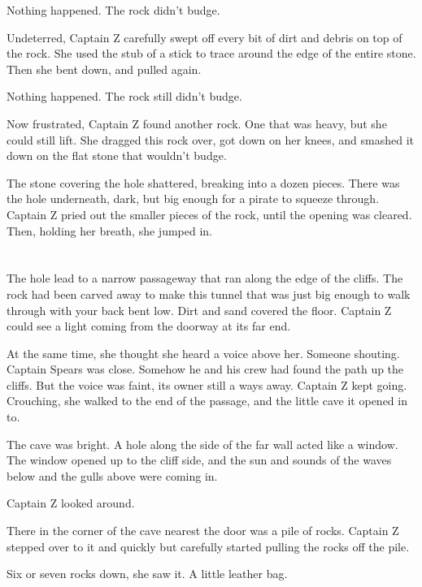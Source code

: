 \documentclass[12pt]{extbook}
\begin{document}
  Nothing happened. The rock didn't budge.
  
  Undeterred, Captain Z carefully swept off every bit of dirt and debris
  on top of the rock. She used the stub of a stick to trace around the
  edge of the entire stone. Then she bent down, and pulled again.
  
  Nothing happened. The rock still didn't budge.
  
  Now frustrated, Captain Z found another rock. One that was heavy, but
  she could still lift. She dragged this rock over, got down on her knees,
  and smashed it down on the flat stone that wouldn't budge.
  
  The stone covering the hole shattered, breaking into a dozen pieces.
  There was the hole underneath, dark, but big enough for a pirate to
  squeeze through. Captain Z pried out the smaller pieces of the rock,
  until the opening was cleared. Then, holding her breath, she jumped in.
  
  \section{}\label{section-19}
  
  The hole lead to a narrow passageway that ran along the edge of the
  cliffs. The rock had been carved away to make this tunnel that was just
  big enough to walk through with your back bent low. Dirt and sand
  covered the floor. Captain Z could see a light coming from the doorway
  at its far end.
  
  At the same time, she thought she heard a voice above her. Someone
  shouting. Captain Spears was close. Somehow he and his crew had found
  the path up the cliffs. But the voice was faint, its owner still a ways
  away. Captain Z kept going. Crouching, she walked to the end of the
  passage, and the little cave it opened in to.
  
  The cave was bright. A hole along the side of the far wall acted like a
  window. The window opened up to the cliff side, and the sun and sounds
  of the waves below and the gulls above were coming in.
  
  Captain Z looked around.
  
  There in the corner of the cave nearest the door was a pile of rocks.
  Captain Z stepped over to it and quickly but carefully started pulling
  the rocks off the pile.
  
  Six or seven rocks down, she saw it. A little leather bag.
  
\end{document}

